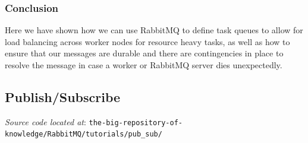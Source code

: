 \documentclass{article}
\begin{document}
\subsubsection{Conclusion}

Here we have shown how we can use RabbitMQ to define task queues to allow for load balancing across worker nodes for resource heavy tasks, as well as how to ensure that our messages are durable and there are contingencies in place to resolve the message in case a worker or RabbitMQ server dies unexpectedly.

\subsection{Publish/Subscribe}

\textit{Source code located at}: \verb|the-big-repository-of-knowledge/RabbitMQ/tutorials/pub_sub/|
\end{document}

